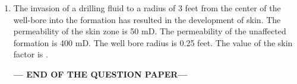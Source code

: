 \documentclass[journal,12pt,onecolumn]{IEEEtran}
\theoremstyle{remark}
\begin{document}
\begin{enumerate}
\item  The invasion of a drilling fluid to a radius of 3 feet from the center of the well-bore into the formation has resulted in the development of skin. The permeability of the skin zone  is 50 mD. The permeability of the unaffected formation is 400 mD. The well bore radius is 0.25 feet. The value of the skin factor is \underline{\hspace{1cm}} .
\begin{enumerate}
\end{enumerate}
\hfill{}

\begin{center}
\textbf{\large --- END OF THE QUESTION PAPER---}
\end{center}
\end{enumerate}
\end{document}
